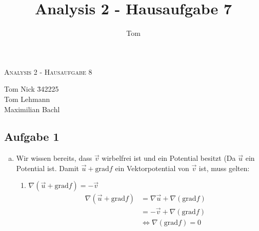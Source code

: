\documentclass[10pt,a4paper,parskip=half]{scrartcl}
\author{Tom}
\title{Analysis 2 - Hausaufgabe 7}
\begin{document}
\begin{center}
\textsc{\Large{Analysis 2 - Hausaufgabe 8}} \\
\end{center}
\begin{tabbing}
Tom Nick \hspace{1.4cm}\= 342225\\
Tom Lehmann\\
Maximilian Bachl
\end{tabbing}

\subsection*{Aufgabe 1}
	\begin{enumerate}[(a)]
		\item Wir wissen bereits, dass $\vec{v}$ wirbelfrei ist und ein Potential besitzt (Da $\vec{u}$ ein Potential ist. Damit $\vec{u} + \text{grad} f$ ein Vektorpotential von $\vec{v}$ ist, muss gelten:
		\begin{enumerate}[1.]
			\item $\nabla (\vec{u} + \text{grad} f) = -\vec{v}  $ \\ 
			\begin{align*}
				\nabla (\vec{u} + \text{grad} f) &= \nabla \vec{u} + \nabla (\text{grad} f) \\
				&= -\vec{v} + \nabla(\text{grad} f) \\
				&\Leftrightarrow \nabla(\text{grad} f) = 0 \\
			\end{align*}
			
		\end{enumerate}
	\end{enumerate}
\end{document}
